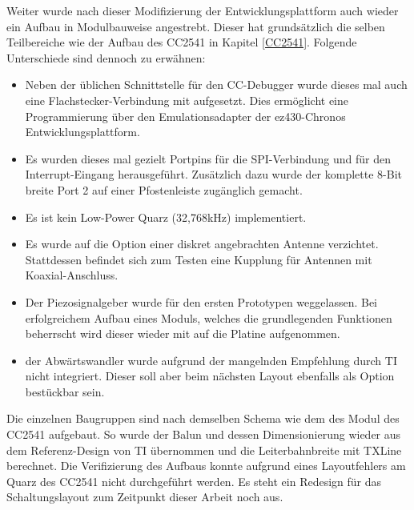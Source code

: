 \documentclass[12pt]{scrreprt} %
\begin{document}
Weiter wurde nach dieser Modifizierung der Entwicklungsplattform auch wieder ein Aufbau in Modulbauweise angestrebt. Dieser hat grundsätzlich die selben Teilbereiche wie der Aufbau des CC2541 in Kapitel \vref{CC2541}. Folgende Unterschiede sind dennoch zu erwähnen:
\begin{itemize}
\item
Neben der üblichen Schnittstelle für den CC-Debugger wurde dieses mal auch eine Flachstecker-Verbindung mit aufgesetzt. Dies ermöglicht eine Programmierung über den Emulationsadapter der ez430-Chronos Entwicklungsplattform.
\item
Es wurden dieses mal gezielt Portpins für die SPI-Verbindung und für den Interrupt-Eingang herausgeführt. Zusätzlich dazu wurde der komplette 8-Bit breite Port 2 auf einer Pfostenleiste zugänglich gemacht.
\item
Es ist kein Low-Power Quarz (32,768kHz) implementiert.
\item
Es wurde auf die Option einer diskret angebrachten Antenne verzichtet. Stattdessen befindet sich zum Testen eine Kupplung für Antennen mit Koaxial-Anschluss.
\item
Der Piezosignalgeber wurde für den ersten Prototypen weggelassen. Bei erfolgreichem Aufbau eines Moduls, welches die grundlegenden Funktionen beherrscht wird dieser wieder mit auf die Platine aufgenommen.
\item
der Abwärtswandler wurde aufgrund der mangelnden Empfehlung durch TI nicht integriert. Dieser soll aber beim nächsten Layout ebenfalls als Option bestückbar sein.
\end{itemize}
Die einzelnen Baugruppen sind nach demselben Schema wie dem des Modul des CC2541 aufgebaut. So wurde der Balun und dessen Dimensionierung wieder aus dem Referenz-Design von TI übernommen und die Leiterbahnbreite mit TXLine berechnet. 
Die Verifizierung des Aufbaus konnte aufgrund eines Layoutfehlers am Quarz des CC2541 nicht durchgeführt werden. Es steht ein Redesign für das Schaltungslayout zum Zeitpunkt dieser Arbeit noch aus. 
\end{document}
